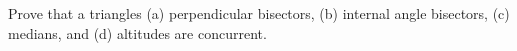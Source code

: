 Prove that a triangle\textquotesingle s (a) perpendicular bisectors, (b) internal angle bisectors, (c) medians, and (d) altitudes are concurrent.
